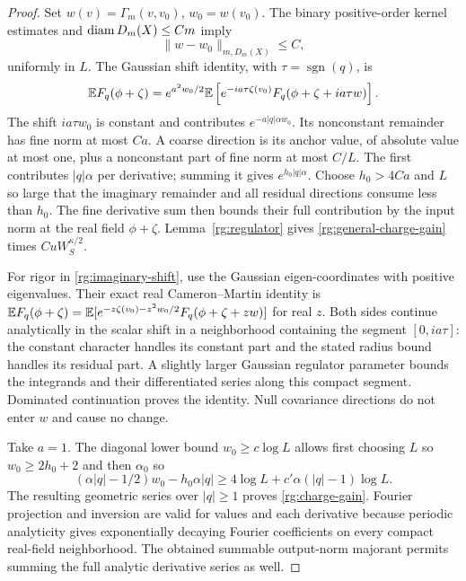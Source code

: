 \begin{proof}
Set $w(v)=\Gamma_m(v,v_0)$, $w_0=w(v_0)$.  The binary positive-order kernel estimates and $\operatorname{diam} D_m(X)\le Cm$ imply
\[
 \|w-w_0\|_{m,D_m(X)}\le C,
\]
uniformly in $L$.  The Gaussian shift identity, with $\tau=\operatorname{sgn}(q)$, is
\begin{equation}\label{rg:imaginary-shift}
 \mathbb E F_q(\phi+\zeta)
 =e^{a^2w_0/2}\mathbb E\left[e^{-ia\tau\zeta(v_0)}
 F_q(\phi+\zeta+ia\tau w)\right].
\end{equation}
The shift $ia\tau w_0$ is constant and contributes $e^{-a|q|\alpha w_0}$.  Its nonconstant remainder has fine norm at most $Ca$.  A coarse direction is its anchor value, of absolute value at most one, plus a nonconstant part of fine norm at most $C/L$.  The first contributes $|q|\alpha$ per derivative; summing it gives $e^{h_0|q|\alpha}$.  Choose $h_0>4Ca$ and $L$ so large that the imaginary remainder and all residual directions consume less than $h_0$.  The fine derivative sum then bounds their full contribution by the input norm at the real field $\phi+\zeta$.  Lemma~\ref{rg:regulator} gives \eqref{rg:general-charge-gain} times $CuW_S^{\kappa/2}$.

For rigor in \eqref{rg:imaginary-shift}, use the Gaussian eigen-coordinates with positive eigenvalues.  Their exact real Cameron--Martin identity is $\mathbb E F_q(\phi+\zeta)=\mathbb E[e^{-z\zeta(v_0)-z^2w_0/2}F_q(\phi+\zeta+zw)]$ for real $z$.  Both sides continue analytically in the scalar shift in a neighborhood containing the segment $[0,ia\tau]$: the constant character handles its constant part and the stated radius bound handles its residual part.  A slightly larger Gaussian regulator parameter bounds the integrands and their differentiated series along this compact segment.  Dominated continuation proves the identity.  Null covariance directions do not enter $w$ and cause no change.

Take $a=1$.  The diagonal lower bound $w_0\ge c\log L$ allows first choosing $L$ so $w_0\ge2h_0+2$ and then $\alpha_0$ so
\[
 (\alpha|q|-1/2)w_0-h_0\alpha|q|\ge4\log L+c'\alpha(|q|-1)\log L.
\]
The resulting geometric series over $|q|\ge1$ proves \eqref{rg:charge-gain}.  Fourier projection and inversion are valid for values and each derivative because periodic analyticity gives exponentially decaying Fourier coefficients on every compact real-field neighborhood.  The obtained summable output-norm majorant permits summing the full analytic derivative series as well.
\end{proof}

